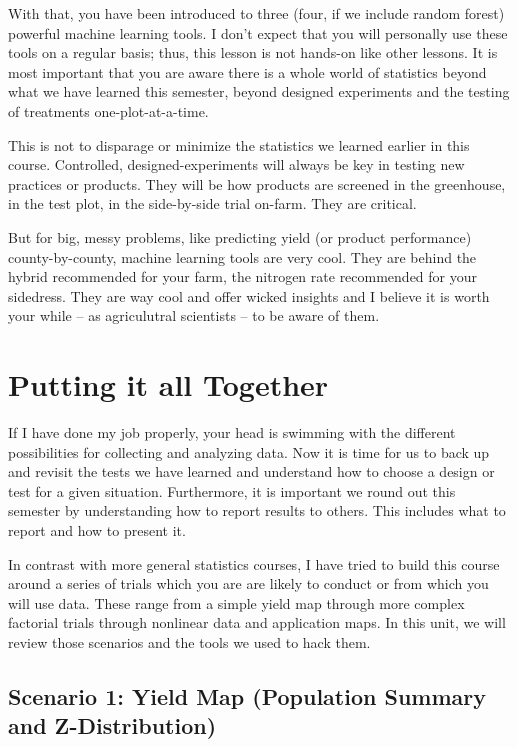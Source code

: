 \documentclass[
]{book}
\begin{document}
With that, you have been introduced to three (four, if we include random forest) powerful machine learning tools. I don't expect that you will personally use these tools on a regular basis; thus, this lesson is not hands-on like other lessons. It is most important that you are aware there is a whole world of statistics beyond what we have learned this semester, beyond designed experiments and the testing of treatments one-plot-at-a-time.

This is not to disparage or minimize the statistics we learned earlier in this course. Controlled, designed-experiments will always be key in testing new practices or products. They will be how products are screened in the greenhouse, in the test plot, in the side-by-side trial on-farm. They are critical.

But for big, messy problems, like predicting yield (or product performance) county-by-county, machine learning tools are very cool. They are behind the hybrid recommended for your farm, the nitrogen rate recommended for your sidedress. They are way cool and offer wicked insights and I believe it is worth your while -- as agriculutral scientists -- to be aware of them.

\hypertarget{putting-it-all-together}{%
\chapter{Putting it all Together}\label{putting-it-all-together}}

If I have done my job properly, your head is swimming with the different possibilities for collecting and analyzing data. Now it is time for us to back up and revisit the tests we have learned and understand how to choose a design or test for a given situation. Furthermore, it is important we round out this semester by understanding how to report results to others. This includes what to report and how to present it.

In contrast with more general statistics courses, I have tried to build this course around a series of trials which you are are likely to conduct or from which you will use data. These range from a simple yield map through more complex factorial trials through nonlinear data and application maps. In this unit, we will review those scenarios and the tools we used to hack them.

\hypertarget{scenario-1-yield-map-population-summary-and-z-distribution}{%
\section{Scenario 1: Yield Map (Population Summary and Z-Distribution)}\label{scenario-1-yield-map-population-summary-and-z-distribution}}
\end{document}
